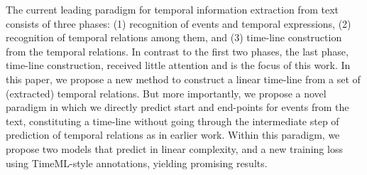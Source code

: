 The current leading paradigm for temporal information extraction from text consists of three phases: (1) recognition of events and temporal expressions, (2) recognition of temporal relations among them, and (3) time-line construction from the temporal relations. In contrast to the first two phases, the last phase, time-line construction, received little attention and is the focus of this work. In this paper, we propose a new method to construct a linear time-line from a set of (extracted) temporal relations. But more importantly, we propose a novel paradigm in which we directly predict start and end-points for events from the text, constituting a time-line without going through the intermediate step of prediction of temporal relations as in earlier work. Within this paradigm, we propose two models that predict in linear complexity, and a new training loss using TimeML-style annotations, yielding promising results.
